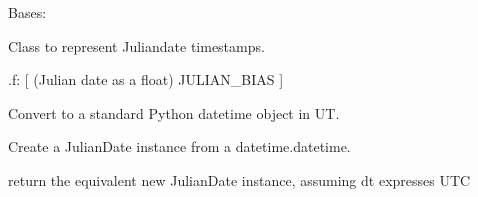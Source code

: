 \documentclass[letterpaper,10pt,english]{sphinxmanual}
\begin{document}
\begin{fulllineitems}
\label{\detokenize{api/killMS.Data:killMS.Data.sidereal.JulianDate}}
\pysigstartsignatures
{}
\pysigstopsignatures
\sphinxAtStartPar
Bases: 

\sphinxAtStartPar
Class to represent Julian\sphinxhyphen{}date timestamps.
\begin{description}
\sphinxAtStartPar
.f:  {[} (Julian date as a float) \sphinxhyphen{} JULIAN\_BIAS {]}

\end{description}

\begin{fulllineitems}
\label{\detokenize{api/killMS.Data:killMS.Data.sidereal.JulianDate.datetime}}
\pysigstartsignatures
{}
\pysigstopsignatures
\sphinxAtStartPar
Convert to a standard Python datetime object in UT.

\end{fulllineitems}


\begin{fulllineitems}
\label{\detokenize{api/killMS.Data:killMS.Data.sidereal.JulianDate.fromDatetime}}
\pysigstartsignatures
{}
\pysigstopsignatures
\sphinxAtStartPar
Create a JulianDate instance from a datetime.datetime.
\begin{description}
\sphinxlineitem{{[} dt is a datetime.datetime instance \sphinxhyphen{}\textgreater{}}\begin{description}
\sphinxAtStartPar
return the equivalent new JulianDate instance,
assuming dt expresses UTC


\end{description}
\end{description}
\end{fulllineitems}
\end{fulllineitems}
\end{document}
